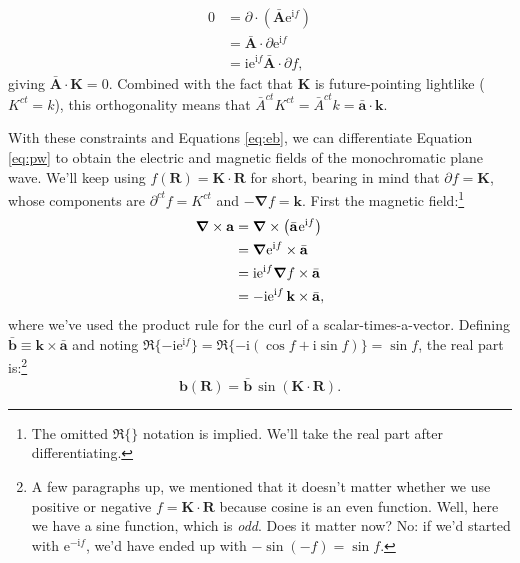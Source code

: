 \documentclass[12pt]{article}
\renewcommand{\vv}[1]{\mathbf{#1}}
\newcommand{\del}{\boldsymbol{\nabla}}
\begin{document}
\begin{equation*}
\begin{aligned}
0 &= \partialup \cdot \left( \bar{\vv A} \mathrm{e}^{\mathrm{i} f} \right) \\
&= \bar{\vv A} \cdot \partialup \mathrm{e}^{\mathrm{i} f} \\
&= \mathrm{i} \mathrm{e}^{\mathrm{i} f} \bar{\vv A} \cdot \partialup f ,
\end{aligned}
\end{equation*}
giving $\bar{\vv A} \cdot \vv K = 0$. Combined with the fact that $\vv K$ is future-pointing lightlike ($K^{ct} = k$), this orthogonality means that $\bar{A}^{ct} K^{ct} = \bar{A}^{ct} k = \bar{\vv a} \cdot \vv k$.

With these constraints and Equations \ref{eq:eb}, we can differentiate Equation \ref{eq:pw} to obtain the electric and magnetic fields of the monochromatic plane wave. We'll keep using $f(\vv R) = \vv K \cdot \vv R$ for short, bearing in mind that $\partialup f = \vv K$, whose components are $\partial^{ct} f = K^{ct}$ and $- \del f = \vv k$. First the magnetic field:\footnote{The omitted $\Re \lbrace \rbrace$ notation is implied. We'll take the real part after differentiating.}
\begin{equation*}
\begin{aligned}
\del \times \vv a &= \del \times \left( \bar{\vv a} \mkern1mu \mathrm{e}^{\mathrm{i} f} \right) \\
&= \del \mathrm{e}^{\mathrm{i} f} \times \bar{\vv a} \\
&= \mathrm{i} \mathrm{e}^{\mathrm{i} f} \del f \times \bar{\vv a} \\
&= - \mathrm{i} \mathrm{e}^{\mathrm{i} f} \, \vv k \times \bar{\vv a},
\end{aligned}
\end{equation*}
where we've used the product rule for the curl of a scalar-times-a-vector. Defining $\bar{\vv b} \equiv \vv k \times \bar{\vv a}$ and noting $\Re \lbrace - \mathrm{i} \mathrm{e}^{\mathrm{i} f} \rbrace = \Re \lbrace -\mathrm{i} ( \cos f + \mathrm{i} \sin f ) \rbrace = \sin f$, the real part is:\footnote{A few paragraphs up, we mentioned that it doesn't matter whether we use positive or negative $f = \vv K \cdot \vv R$ because cosine is an even function. Well, here we have a sine function, which is \emph{odd}. Does it matter now? No: if we'd started with $\mathrm{e}^{-\mathrm{i} f}$, we'd have ended up with $- \sin (-f) = \sin f$.}
\begin{equation}\label{eq:bpw}
\vv b (\vv R) = \bar{\vv b} \, \sin \left( \vv K \cdot \vv R \right) .
\end{equation}
\end{document}
